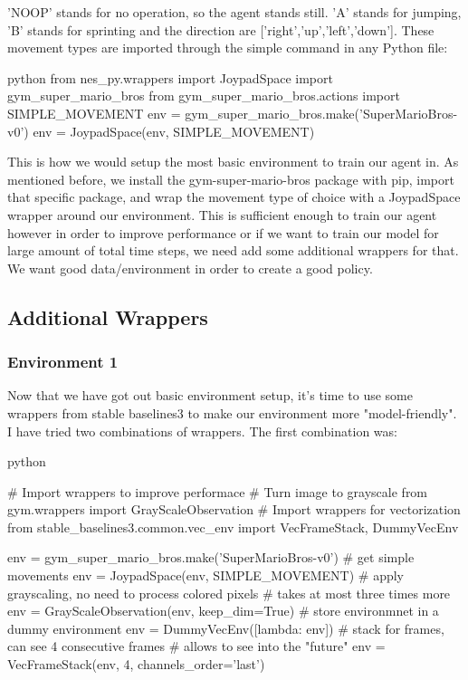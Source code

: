 \documentclass{article}
\numberwithin{equation}{section}
\numberwithin{equation}{section}
\begin{document}
'NOOP' stands for no operation, so the agent stands still. 'A' stands for jumping, 'B' stands for sprinting and the direction are ['right','up','left','down']. These movement types are imported through the simple command in any Python file:
\begin{mintedbox}{python}
from nes_py.wrappers import JoypadSpace
import gym_super_mario_bros
from gym_super_mario_bros.actions import SIMPLE_MOVEMENT
env = gym_super_mario_bros.make('SuperMarioBros-v0')
env = JoypadSpace(env, SIMPLE_MOVEMENT)
\end{mintedbox}

This is how we would setup the most basic environment to train our agent in. As mentioned before, we install the gym-super-mario-bros package with pip, import that specific package, and wrap the movement type of choice with a JoypadSpace wrapper around our environment. This is sufficient enough to train our agent however in order to improve performance or if we want to train our model for large amount of total time steps, we need add some additional wrappers for that. We want good data/environment in order to create a good policy.


\subsection*{Additional Wrappers}
\subsubsection*{Environment 1}
Now that we have got out basic environment setup, it's time to use some wrappers from stable baselines3 to make our environment more "model-friendly". I have tried two combinations of wrappers. The first combination was:

\begin{mintedbox}{python}

# Import wrappers to improve performace
# Turn image to grayscale
from gym.wrappers import GrayScaleObservation
# Import wrappers for vectorization
from stable_baselines3.common.vec_env import VecFrameStack, DummyVecEnv

env = gym_super_mario_bros.make('SuperMarioBros-v0')
# get simple movements
env = JoypadSpace(env, SIMPLE_MOVEMENT)
# apply grayscaling, no need to process colored pixels
# takes at most three times more
env = GrayScaleObservation(env, keep_dim=True)
# store environmnet in a dummy environment
env = DummyVecEnv([lambda: env])
# stack for frames, can see 4 consecutive frames
# allows to see into the "future"
env = VecFrameStack(env, 4, channels_order='last')
\end{mintedbox}
\end{document}
